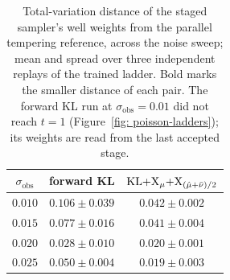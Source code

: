 \documentclass{article}
\begin{document}
\begin{table}[h]
    \centering
    \small
    \begin{tabular}{@{}c c c@{}}
        \toprule
        $\sigma_{\mathrm{obs}}$ & forward KL & $\mathrm{KL}{+}\mathrm{X}_\mu{+}\mathrm{X}_{(\hat\mu+\bar\nu)/2}$ \\
        \midrule
        $0.010$ & $0.106 \pm 0.039$ & $\mathbf{0.042 \pm 0.002}$ \\
        $0.015$ & $0.077 \pm 0.016$ & $\mathbf{0.041 \pm 0.004}$ \\
        $0.020$ & $0.028 \pm 0.010$ & $\mathbf{0.020 \pm 0.001}$ \\
        $0.025$ & $0.050 \pm 0.004$ & $\mathbf{0.019 \pm 0.003}$ \\
        \bottomrule
    \end{tabular}
    \caption{Total-variation distance of the staged sampler's well weights from the parallel tempering reference, across the noise sweep; mean and spread over three independent replays of the trained ladder. Bold marks the smaller distance of each pair. The forward KL run at $\sigma_{\mathrm{obs}} = 0.01$ did not reach $t = 1$ (Figure~\ref{fig: poisson-ladders}); its weights are read from the last accepted stage.}
    \label{tab: poisson-tv}
\end{table}
\end{document}
